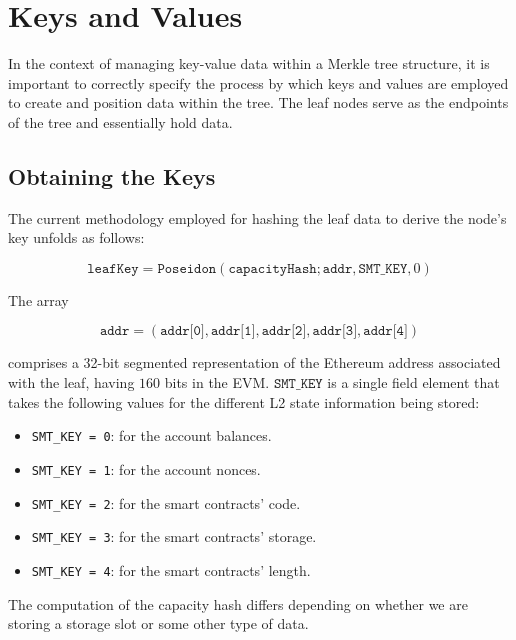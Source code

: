 



\section{Keys and Values}

In the context of managing key-value data within a Merkle tree structure, it is important to correctly specify the process by which keys and values are employed to create and position data within the tree. The leaf nodes serve as the endpoints of the tree and essentially hold data.

\subsection{Obtaining the Keys}

The current methodology employed for hashing the leaf data to derive the node's key unfolds as follows:

$$ \texttt{leafKey} = \texttt{Poseidon}(\texttt{capacityHash}; \texttt{addr}, \texttt{SMT\_KEY}, 0) $$

The array

$$ \texttt{addr} = (\texttt{addr[0]}, \texttt{addr[1]}, \texttt{addr[2]}, \texttt{addr[3]}, \texttt{addr[4]}) $$

comprises a 32-bit segmented representation of the Ethereum address associated with the leaf, having $160$ bits in the EVM. $\texttt{SMT\_KEY}$ is a single field element that takes the following values for the different L2
state information being stored:

\begin{itemize}
\item \texttt{SMT\_KEY = 0}: for the account balances.
\item \texttt{SMT\_KEY = 1}: for the account nonces.
\item \texttt{SMT\_KEY = 2}: for the smart contracts' code.
\item \texttt{SMT\_KEY = 3}: for the smart contracts' storage.
\item \texttt{SMT\_KEY = 4}: for the smart contracts' length.
\end{itemize}

The computation of the capacity hash differs depending on whether we are storing a storage slot or some other type of data.

